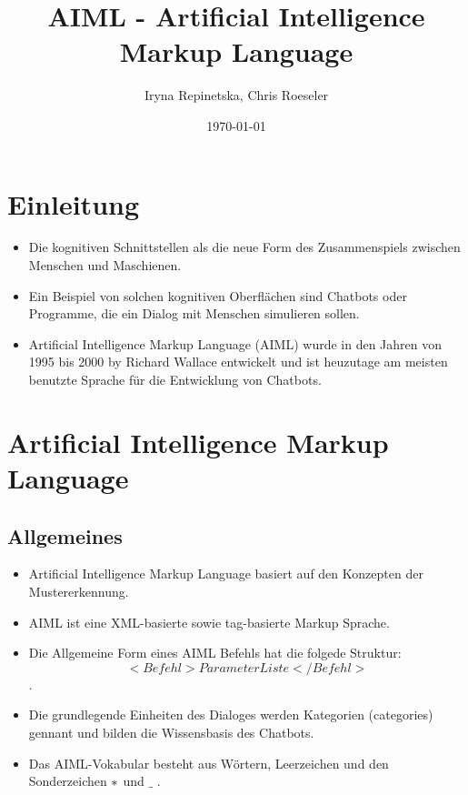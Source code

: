 \documentclass[9pt]{beamer}
\author{Iryna Repinetska, Chris Roeseler}
\title{AIML - Artificial Intelligence Markup Language}
\institute{Institut f\"ur Informatik Humboldt-Universit\"at zu Berlin}
\date{\today}
\begin{document}
\begin{frame}%
  \titlepage %
\end{frame} %

\section{Einleitung}
\begin{frame}
\begin{itemize}
\item Die kognitiven Schnittstellen als die neue Form des Zusammenspiels zwischen Menschen und Maschienen.
\item Ein Beispiel von solchen kognitiven Oberflächen sind Chatbots oder Programme, die ein Dialog mit Menschen simulieren sollen.
\item Artificial Intelligence Markup Language (AIML) wurde in den Jahren von 1995 bis 2000  by Richard Wallace entwickelt und ist heuzutage am meisten benutzte Sprache für die Entwicklung von Chatbots.
\end{itemize}

\end{frame}
\section{Artificial Intelligence Markup Language}
\subsection{Allgemeines}
\begin{frame}
\begin{itemize}
\item Artificial Intelligence Markup Language basiert auf den Konzepten der Mustererkennung.
\item  AIML ist eine XML-basierte sowie tag-basierte Markup Sprache.
\item Die Allgemeine Form eines AIML Befehls hat die folgede Struktur:
$$<Befehl> ParameterListe </Befehl>$$.
\item Die grundlegende Einheiten des Dialoges werden Kategorien (categories) gennant und bilden die Wissensbasis des Chatbots.
\item Das AIML-Vokabular besteht aus Wörtern, Leerzeichen und den Sonderzeichen $\**$ und $\_$ .
\end{itemize}



\end{frame}
\end{document}
